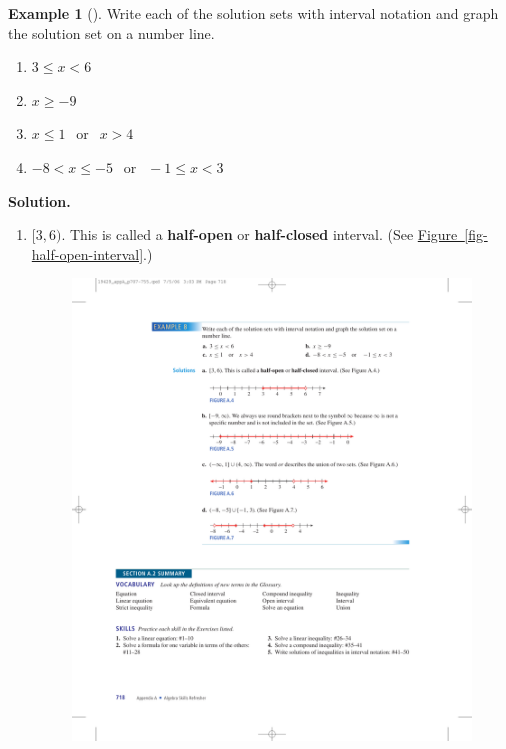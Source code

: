 \documentclass[10pt,]{book}
\newcommand{\terminology}[1]{\textbf{#1}}
\theoremstyle{plain}
\theoremstyle{definition}
\theoremstyle{definition}
\newtheorem{example}[theorem]{Example}
\theoremstyle{definition}
\numberwithin{equation}{part}
\newcommand{\lt}{<}
\newcommand{\gt}{>}
\begin{document}
\begin{example}[]\label{example-17}
Write each of the solution sets with interval notation and graph the solution set on a number line. \leavevmode%
\begin{enumerate}[label=*\alph**]
\item\hypertarget{li-119}{}\(3 \le x \lt 6\)%
\item\hypertarget{li-120}{}\(x \ge −9\)%
\item\hypertarget{li-121}{}\(x\le 1 ~~\text{ or }~~ x\gt 4\)%
\item\hypertarget{li-122}{}\(−8 \lt x \le −5 ~~\text{ or }~~ −1 \le x \lt 3\)%
\end{enumerate}
%
\par\medskip\noindent%
\textbf{Solution.}\quad \leavevmode%
\begin{enumerate}[label=*\alph**]
\item\hypertarget{li-123}{}\([3, 6)\). This is called a \terminology{half-open} or \terminology{half-closed} interval. (See \hyperref[fig-half-open-interval]{Figure~\ref{fig-half-open-interval}}.) \leavevmode%
\begin{figure}
\centering
\includegraphics[width=1\linewidth]{images/fig-half-open-interval}

\end{figure}
\end{enumerate}
\end{example}
\end{document}
